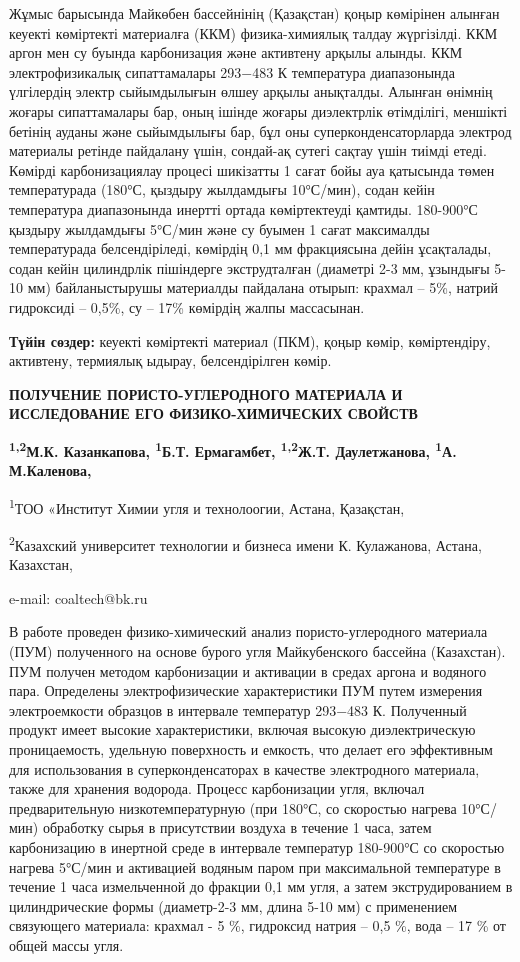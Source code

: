 Жұмыс барысында Майкөбен бассейнінің (Қазақстан) қоңыр көмірінен алынған
кеуекті көміртекті материалға (ККМ) физика-химиялық талдау жүргізілді.
ККМ аргон мен су буында карбонизация және активтену арқылы алынды. ККМ
электрофизикалық сипаттамалары 293−483 К температура диапазонында
үлгілердің электр сыйымдылығын өлшеу арқылы анықталды. Алынған өнімнің
жоғары сипаттамалары бар, оның ішінде жоғары диэлектрлік өтімділігі,
меншікті бетінің ауданы және сыйымдылығы бар, бұл оны
суперконденсаторларда электрод материалы ретінде пайдалану үшін,
сондай-ақ сутегі сақтау үшін тиімді етеді. Көмірді карбонизациялау
процесі шикізатты 1 сағат бойы ауа қатысында төмен температурада (180°С,
қыздыру жылдамдығы 10°С/мин), содан кейін температура диапазонында
инертті ортада көміртектеуді қамтиды. 180-900°С қыздыру жылдамдығы
5°С/мин және су буымен 1 сағат максималды температурада белсендіріледі,
көмірдің 0,1 мм фракциясына дейін ұсақталады, содан кейін цилиндрлік
пішіндерге экструдталған (диаметрі 2-3 мм, ұзындығы 5-10 мм)
байланыстырушы материалды пайдалана отырып: крахмал -- 5\%, натрий
гидроксиді -- 0,5\%, су -- 17\% көмірдің жалпы массасынан.

{\bfseries Түйін сөздер:} кеуекті көміртекті материал (ПКМ), қоңыр көмір,
көміртендіру, активтену, термиялық ыдырау, белсендірілген көмір.
\newpage
\begin{center}
{\large\bfseries ПОЛУЧЕНИЕ ПОРИСТО-УГЛЕРОДНОГО МАТЕРИАЛА И ИССЛЕДОВАНИЕ ЕГО
ФИЗИКО-ХИМИЧЕСКИХ СВОЙСТВ}

{\bfseries \textsuperscript{1,2}М.К. Казанкапова, \textsuperscript{1}Б.Т.
Ермагамбет, \textsuperscript{1,2}Ж.Т. Даулетжанова\envelope,
\textsuperscript{1}А. М.Каленова,}

\textsuperscript{1}ТОО «Институт Химии угля и технолоогии, Астана,
Қазақстан,

\textsuperscript{2}Казахский университет технологии и бизнеса имени К.
Кулажанова, Астана, Казахстан,

e-mail: coaltech@bk.ru
\end{center}

В работе проведен физико-химический анализ пористо-углеродного материала
(ПУМ) полученного на основе бурого угля Майкубенского бассейна
(Казахстан). ПУМ получен методом карбонизации и активации в средах
аргона и водяного пара. Определены электрофизические характеристики ПУМ
путем измерения электроемкости образцов в интервале температур 293−483
К. Полученный продукт имеет высокие характеристики, включая высокую
диэлектрическую проницаемость, удельную поверхность и емкость, что
делает его эффективным для использования в суперконденсаторах в качестве
электродного материала, также для хранения водорода. Процесс
карбонизации угля, включал предварительную низкотемпературную (при
180°С, со скоростью нагрева 10°С/мин) обработку сырья в присутствии
воздуха в течение 1 часа, затем карбонизацию в инертной среде в
интервале температур 180-900°С со скоростью нагрева 5°С/мин и активацией
водяным паром при максимальной температуре в течение 1 часа измельченной
до фракции 0,1 мм угля, а затем экструдированием в цилиндрические формы
(диаметр-2-3 мм, длина 5-10 мм) с применением связующего материала:
крахмал - 5 \%, гидроксид натрия -- 0,5 \%, вода -- 17 \% от общей массы
угля.

